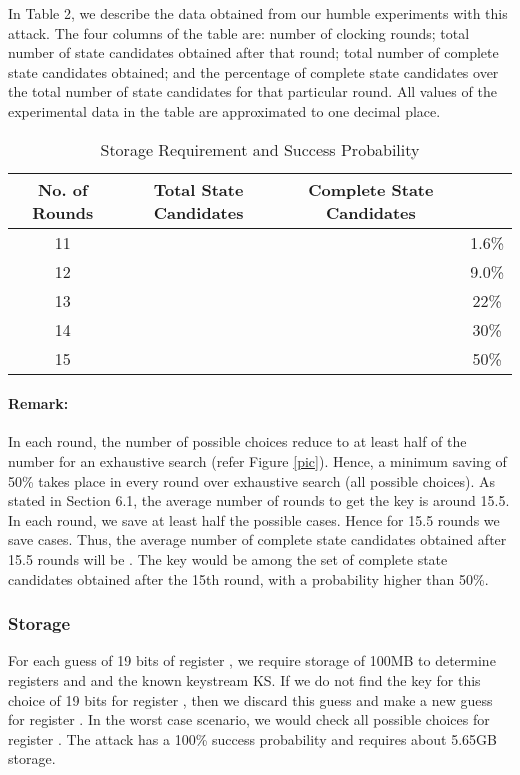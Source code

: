 \documentclass{llncs}
\begin{document}
In Table 2, we describe the data obtained from our humble experiments with this attack. The four columns of the table are: number of clocking rounds; total number of state candidates obtained after that round; total number of complete state candidates obtained; and the percentage of complete state candidates over the total number of state candidates for that particular round. All values of the experimental data in the table are approximated to one decimal place.
\begin{table}[!htb]
\caption{Storage Requirement and Success Probability} \centering      \begin{tabular}{c c c c}  \hline\hline                        No. of Rounds & Total State Candidates & Complete State Candidates &  \\ [0.5ex] \hline                 11 &  &  & 1.6\% \\   12 &  &  & 9.0\% \\ 
13 &  &  & 22\%  \\ 
14 &  &  & 30\% \\ 
15 &  &  & 50\% \\ [1ex]       \hline     \end{tabular} 
\label{table}  \end{table}
\paragraph{Remark:}
In each round, the number of possible choices reduce to at least half of the number for an exhaustive search (refer Figure \ref{pic}). Hence, a minimum saving of 50\% takes place in every round over exhaustive search (all possible choices). As stated in Section 6.1, the average number of rounds to get the key is around 15.5. In each round, we save at least half the possible cases. Hence for 15.5 rounds we save  cases. Thus, the average number of complete state candidates obtained after 15.5 rounds will be . The key would be among the set of complete state candidates obtained after the 15th round, with a probability higher than 50\%.
\subsubsection{Storage} 
For each guess of 19 bits of register , we require storage of 100MB to determine registers  and  and the known keystream KS. If we do not find the key for this choice of 19 bits for register , then we discard this guess and make a new guess for register . In the worst case scenario, we would check all  possible choices for register . The attack has a 100\% success probability and requires about 5.65GB storage.
\end{document}
